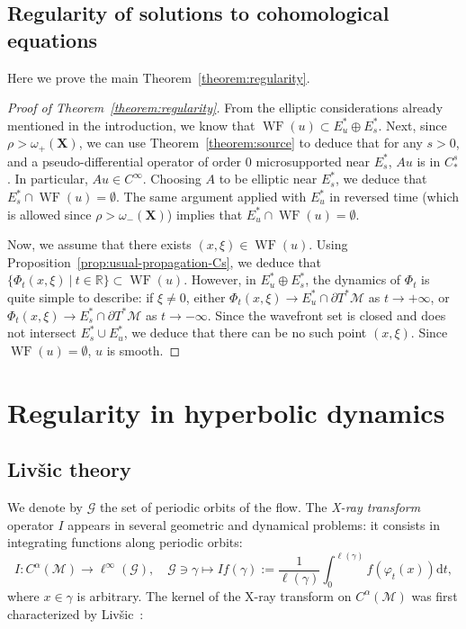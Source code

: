 \documentclass[AHL,Unicode,longabstracts,published]{cedram}
\newcommand{\R}{\mathbb{R}}
\newcommand{\X}{\mathbf{X}}
\newcommand{\mc}{\mathcal}
\newcommand{\M}{\mathcal{M}}
\newcommand{\dd}{\mathrm{d}}
\DeclareMathOperator{\WF}{WF}
\begin{document}
\subsection{Regularity of solutions to cohomological equations}\label{sec:proof-main}

Here we prove the main Theorem~\ref{theorem:regularity}.

\begin{proof}[Proof of Theorem~\ref{theorem:regularity}]
From the elliptic considerations already mentioned in the introduction, we know that $\WF(u) \subset E^\ast_u \oplus E^\ast_s$. Next, since $\rho >
\omega_+(\X)$, we can use Theorem~\ref{theorem:source} to deduce that for any $s>0$, and a pseudo-differential operator of order $0$ microsupported near $E^\ast_s$, $Au$ is in $C^s_\ast$. In particular, $A u\in C^\infty$. Choosing $A$ to be elliptic near $E^\ast_s$, we deduce that $E^\ast_s \cap \WF(u) =
\emptyset$. The same argument applied with $E^\ast_u$ in reversed time (which is allowed since $\rho > \omega_-(\X)$) implies that $E^\ast_u \cap \WF(u) =
\emptyset$.

Now, we assume that there exists $(x,\xi)\in \WF(u)$. Using Proposition~\ref{prop:usual-propagation-Cs}, we deduce that $\{ \Phi_t(x,\xi) \ |\ t\in \R\}\subset \WF(u)$. However, in $E^\ast_u \oplus E^\ast_s$, the dynamics of $\Phi_t$ is quite simple to describe: if $\xi\neq 0$, either $\Phi_t(x,\xi) \to E^\ast_u \cap \partial T^\ast \M$ as $t\to + \infty$, or $\Phi_t(x,\xi) \to E^\ast_s\cap \partial T^\ast \M$ as $t\to -\infty$. Since the wavefront set is closed and does not intersect $E^\ast_s \cup E^\ast_u$, we deduce that there can be no such point $(x,\xi)$. Since $\WF(u) = \emptyset$, $u$ is smooth.
\end{proof}



\section{Regularity in hyperbolic dynamics}
\label{section:cohomological}


\subsection{Liv{\v s}ic theory}

We denote by $\mc{G}$ the set of periodic orbits of the flow. The \emph{X-ray transform} operator $I$ appears in several geometric and dynamical problems: it consists in integrating functions along periodic orbits:
\begin{equation}\label{equation:xray}
I : C^\alpha(\M) \rightarrow \ell^\infty(\mc{G}),\quad \mc{G} \ni \gamma \mapsto If(\gamma) := \dfrac{1}{\ell(\gamma)} \int_0^{\ell(\gamma)} f(\varphi_t(x)) \dd t,
\end{equation}
where $x \in \gamma$ is arbitrary. The kernel of the X-ray transform on $C^\alpha(\M)$ was first characterized by Liv{\v s}ic~\cite{Livsic-72}:
\end{document}
